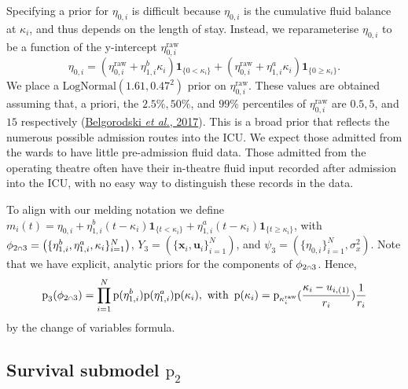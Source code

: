 \documentclass[
  10pt,
  a4paper,
]{article}
\let\Oldcap\cap
\renewcommand{\cap}{\mathrel{\mathsmaller{\Oldcap}}}
\newcommand{\pd}{\text{p}}
\begin{document}
Specifying a prior for \(\eta_{0, i}\) is difficult because
\(\eta_{0, i}\) is the cumulative fluid balance at \(\kappa_{i}\), and
thus depends on the length of stay. Instead, we reparameterise
\(\eta_{0, i}\) to be a function of the y-intercept
\(\eta_{0, i}^{\text{raw}}\) \begin{equation}
  \eta_{0, i} =
    (\eta_{0, i}^{\text{raw}} + \eta^{b}_{1, i} \kappa_{i}) \boldsymbol{1}_{\{0 < \kappa_{i}\}} +
    (\eta_{0, i}^{\text{raw}} + \eta^{a}_{1, i} \kappa_{i}) \boldsymbol{1}_{\{0 \geq \kappa_{i}\}}.
\end{equation} We place a \(\text{LogNormal}(1.61, 0.47^2)\) prior on
\(\eta_{0, i}^{\text{raw}}\). These values are obtained assuming that, a
priori, the \(2.5\%, 50\%\), and \(99\%\) percentiles of
\(\eta_{0, i}^{\text{raw}}\) are \(0.5, 5\), and \(15\) respectively
(\protect\hyperlink{ref-belgorodski_rriskdistributions_2017}{Belgorodski
\emph{et al.}, 2017}). This is a broad prior that reflects the numerous
possible admission routes into the ICU. We expect those admitted from
the wards to have little pre-admission fluid data. Those admitted from
the operating theatre often have their in-theatre fluid input recorded
after admission into the ICU, with no easy way to distinguish these
records in the data.

To align with our melding notation we define
\(m_{i}(t) = \eta_{0, i} + \eta^{b}_{1, i}(t - \kappa_{i})\boldsymbol{1}_{\{t < \kappa_{i}\}} + \eta^{a}_{1, i}(t - \kappa_{i})\boldsymbol{1}_{\{t \geq \kappa_{i}\}}\),
with
\(\phi_{2 \cap 3} = \left(\{\eta^{b}_{1, i}, \eta^{a}_{1, i}, \kappa_{i}\}_{i = 1}^{N}\right)\),
\(Y_{3} = (\{\boldsymbol{x}_{i}, \boldsymbol{u}_{i}\}_{i = 1}^{N})\),
and \(\psi_{3} = (\{\eta_{0, i}\}_{i = 1}^{N}, \sigma^{2}_{x})\). Note
that we have explicit, analytic priors for the components of
\(\phi_{2 \cap 3}\). Hence, \begin{equation}
  \pd_{3}(\phi_{2 \cap 3}) = \prod_{i = 1}^{N} \pd(\eta^{b}_{1, i}) \pd(\eta^{a}_{1, i}) \pd(\kappa_{i}), \,\, \text{with} \,\,\,
  \pd(\kappa_{i}) = \pd_{\kappa^{\text{raw}}_{i}}(\frac{\kappa_{i} - u_{i, (1)}}{r_{i}}) \frac{1}{r_{i}}
\end{equation} by the change of variables formula.

\hypertarget{survival-submodel-pd_2}{%
\subsection{\texorpdfstring{Survival submodel
\(\pd_{2}\)}{Survival submodel \textbackslash pd\_\{2\}}}\label{survival-submodel-pd_2}}
\end{document}
